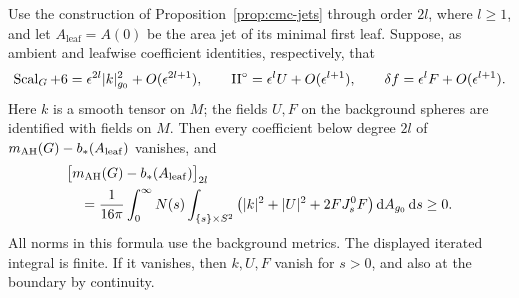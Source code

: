 \begin{proposition}
\label{prop:leading-energy}
Use the construction of Proposition~\ref{prop:cmc-jets} through order
\(2l\), where \(l\ge1\), and let \(A_{\mathrm{leaf}}=A(0)\) be the area
jet of its minimal first leaf.
Suppose, as ambient and leafwise coefficient identities, respectively,
that
\begin{equation}\label{cmc:leading-assumptions}
 \operatorname{Scal}_G+6=\epsilon^{2l}|k|_{g_0}^2+O(\epsilon^{2l+1}),
 \qquad
 \mathrm{II}^\circ=\epsilon^lU+O(\epsilon^{l+1}),
 \qquad
 \delta f=\epsilon^lF+O(\epsilon^{l+1}).
\end{equation}
Here \(k\) is a smooth tensor on \(M\); the fields \(U,F\) on the
background spheres are identified with fields on \(M\).
Then every coefficient below degree \(2l\) of
\(m_{\mathrm{AH}}(G)-b_*(A_{\mathrm{leaf}})\) vanishes, and
\begin{equation}\label{cmc:leading-integral}
 \begin{split}
 &\bigl[m_{\mathrm{AH}}(G)-b_*(A_{\mathrm{leaf}})\bigr]_{2l}\\
 &\quad=\frac1{16\pi}\int_0^\infty N(s)
   \int_{\{s\}\times S^2}
    \left(|k|^2+|U|^2+2FJ_s^0F\right)\mathrm{d} A_{g_0}\,\mathrm{d} s
 \ge0.
 \end{split}
\end{equation}
All norms in this formula use the background metrics.
The displayed iterated integral is finite.
If it vanishes, then \(k,U,F\) vanish for \(s>0\), and also at the
boundary by continuity.
\end{proposition}

